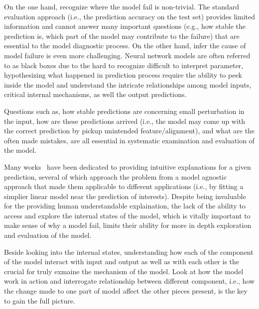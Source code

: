On the one hand, recognize where the model fail is non-trivial. The standard evaluation approach (i.e., the prediction accuracy on the test set) provides limited information and cannot answer many important questions (e.g., how stable the prediction is, which part of the model may contribute to the failure) that are essential to the model diagnostic process. On the other hand, infer the cause of model failure is even more challenging. Neural network models are often referred to as black boxes due to the hard to recognize  difficult to interpret parameter, hypothesizing what happened in prediction process require the ability to peek inside the model and understand the intricate relationships among model inputs, critical internal mechanisms, as well the output predictions.


Questions such as, how stable predictions are concerning small perturbation in the input, how are these predictions arrived (i.e., the model may come up with the correct prediction by pickup unintended feature/alignment), and what are the often made mistakes, are all essential in systematic examination and evaluation of the model. 



%
Many works~\cite{RibeiroSinghGuestrin2016} have been dedicated to providing intuitive explanations for a given prediction, several of which approach the problem from a model agnostic approach that made them applicable to different applications (i.e., by fitting a simplier linear model near the prediction of interests).
%
Despite being invaluable for the providing human understandable explaination, the lack of the ability to access and explore the internal states of the model, which is vitally important to make sense of why a model fail, limits their ability for more in depth exploration and evaluation of the model.


Beside looking into the internal states, understanding how each of the component of the model interact with input and output as well as with each other is the crucial for truly exmaine the mechanism of the model.
%
Look at how the model work in action and interrogate relationship between different component, i.e., how the change made to one part of model affect the other pieces present, is the key to gain the full picture.

